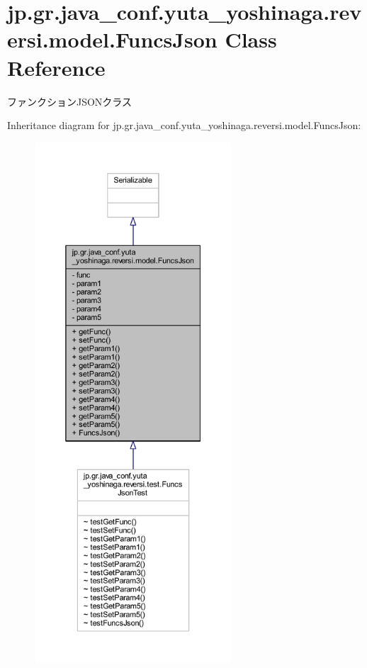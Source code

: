 \hypertarget{classjp_1_1gr_1_1java__conf_1_1yuta__yoshinaga_1_1reversi_1_1model_1_1_funcs_json}{}\section{jp.\+gr.\+java\+\_\+conf.\+yuta\+\_\+yoshinaga.\+reversi.\+model.\+Funcs\+Json Class Reference}
\label{classjp_1_1gr_1_1java__conf_1_1yuta__yoshinaga_1_1reversi_1_1model_1_1_funcs_json}


ファンクション\+J\+S\+O\+Nクラス  




Inheritance diagram for jp.\+gr.\+java\+\_\+conf.\+yuta\+\_\+yoshinaga.\+reversi.\+model.\+Funcs\+Json\+:
\nopagebreak
\begin{figure}[H]
\begin{center}
\leavevmode
\includegraphics[height=550pt]{classjp_1_1gr_1_1java__conf_1_1yuta__yoshinaga_1_1reversi_1_1model_1_1_funcs_json__inherit__graph}
\end{center}
\end{figure}


